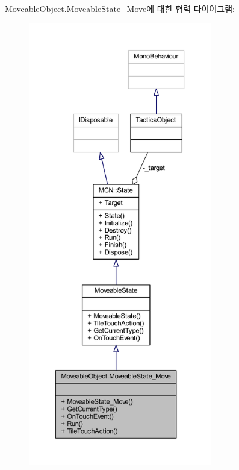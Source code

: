 Moveable\+Object.\+Moveable\+State\+\_\+\+Move에 대한 협력 다이어그램\+:\nopagebreak
\begin{figure}[H]
\begin{center}
\leavevmode
\includegraphics[height=550pt]{class_moveable_object_1_1_moveable_state___move__coll__graph}
\end{center}
\end{figure}
